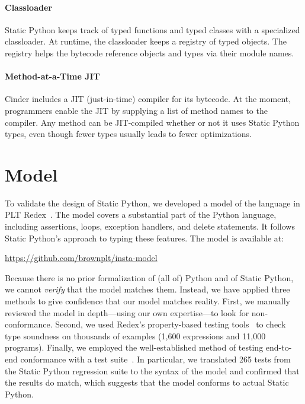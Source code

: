 \documentclass[english,cleveref,submission]{programming}
\newcommand{\SP}{Static Python}
\newcommand{\numSPtest}{265}
\begin{document}
\paragraph{Classloader}
\label{s:classloader}

\SP{} keeps track of typed functions and typed classes with a specialized classloader.
At runtime, the classloader keeps a registry of typed objects.
The registry helps the bytecode reference objects and types via their module names.


\paragraph{Method-at-a-Time JIT}
\label{s:jit}

Cinder includes a JIT (just-in-time) compiler for its bytecode.
At the moment, programmers enable the JIT by supplying a list of method names
to the compiler.
Any method can be JIT-compiled whether or not it uses \SP{} types,
even though fewer types usually leads to fewer optimizations.


\section{Model}
\label{s:model}

To validate the design of \SP{}, we developed a model of the language in PLT
Redex~\cite{kcdeffmrtf-popl-2012}.
The model covers a substantial part of the Python language, including
assertions, loops, exception handlers, and delete statements.
It follows \SP{}'s approach to typing these features.
The model is available at:
\begin{center}
  \url{https://github.com/brownplt/insta-model}
\end{center}
Because there is no prior formalization of (all of) Python and of \SP{}, we cannot
\emph{verify} that the model matches them. Instead, we have applied
three methods to give confidence that our model matches reality.
First, we manually reviewed the model in depth---using our
own expertise---to look for non-conformance.  Second, 
we used Redex's property-based testing tools~\cite{kf-sfp-2009} to check
type soundness on thousands of examples (1,600 expressions and 11,000
programs).
Finally, we employed the well-established method of testing end-to-end
conformance with a test suite~\cite{gsk-ecoop-2010,gclpk-dls-2012,pmmwplck-oopsla-2013,bcfgmnss-popl-2014,fgpssmds-popl-2016}.
In particular, we translated \numSPtest{} tests from the \SP{} regression suite to the
syntax of the model and confirmed that the results
do match,
which suggests that the model conforms to actual \SP{}.
\end{document}
